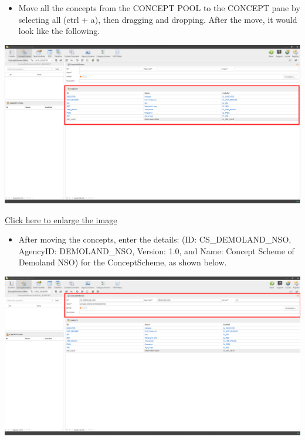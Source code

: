 \documentclass[
]{book}
\providecommand{\tightlist}{%
  \setlength{\itemsep}{0pt}\setlength{\parskip}{0pt}}
\begin{document}
\begin{itemize}
\tightlist
\item
  Move all the concepts from the CONCEPT POOL to the CONCEPT pane by selecting all (ctrl + a), then dragging and dropping. After the move, it would look like the following.
\end{itemize}

\begin{center}\includegraphics[width=1\linewidth]{./images/image114} \end{center}

\href{images/image114.png}{Click here to enlarge the image}

\begin{itemize}
\tightlist
\item
  After moving the concepts, enter the details: (ID: CS\_DEMOLAND\_NSO, AgencyID: DEMOLAND\_NSO, Version: 1.0, and Name: Concept Scheme of Demoland NSO) for the ConceptScheme, as shown below.
\end{itemize}

\begin{center}\includegraphics[width=1\linewidth]{./images/image116} \end{center}
\end{document}
